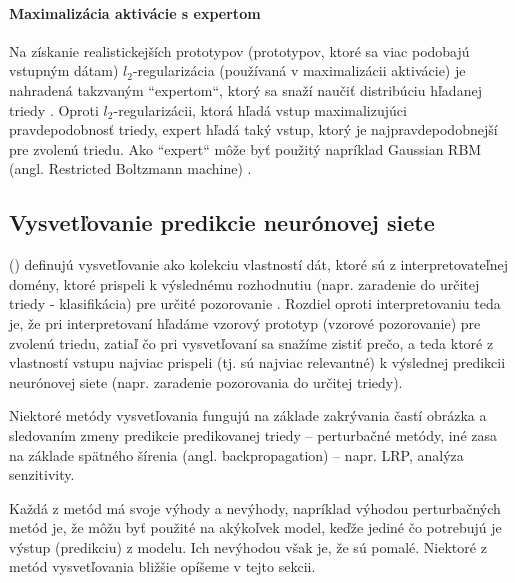 \paragraph{Maximalizácia aktivácie s expertom}
Na získanie realistickejších prototypov (prototypov, ktoré sa viac podobajú vstupným dátam) $l_2$-regularizácia (používaná v maximalizácii aktivácie) je nahradená takzvaným ``expertom``, ktorý sa snaží naučiť distribúciu hľadanej triedy \cite{montavon2018methods}. Oproti $l_2$-regularizácii, ktorá hľadá vstup maximalizujúci pravdepodobnosť triedy, expert hľadá taký vstup, ktorý je najpravdepodobnejší pre zvolenú triedu. Ako ``expert`` môže byť použitý napríklad Gaussian RBM (angl. Restricted Boltzmann machine) \cite{montavon2018methods}.


\subsection{Vysvetľovanie predikcie neurónovej siete}

\citeauthor{montavon2018methods} (\citeyear{montavon2018methods}) definujú vysvetľovanie ako kolekciu vlastností dát, ktoré sú z interpretovateľnej domény, ktoré prispeli k výslednému rozhodnutiu (napr. zaradenie do určitej triedy - klasifikácia) pre určité pozorovanie \cite{montavon2018methods}. Rozdiel oproti interpretovaniu teda je, že pri interpretovaní hľadáme vzorový prototyp (vzorové pozorovanie) pre zvolenú triedu, zatiaľ čo pri vysvetľovaní sa snažíme zistiť prečo, a teda ktoré z vlastností vstupu najviac prispeli (tj. sú najviac relevantné) k výslednej predikcii neurónovej siete (napr. zaradenie pozorovania do určitej triedy). 

Niektoré metódy vysvetľovania fungujú na základe zakrývania častí obrázka a sledovaním zmeny predikcie predikovanej triedy -- perturbačné metódy, iné zasa na základe spätného šírenia (angl. backpropagation) -- napr. LRP, analýza senzitivity.

Každá z metód má svoje výhody a nevýhody, napríklad výhodou perturbačných metód je, že môžu byť použité na akýkoľvek model, keďže jediné čo potrebujú je výstup (predikciu) z modelu. Ich nevýhodou však je, že sú pomalé. Niektoré z metód vysvetľovania bližšie opíšeme v tejto sekcii.

